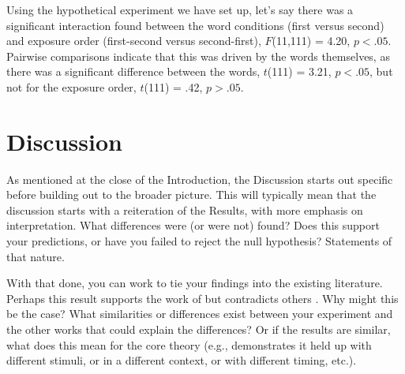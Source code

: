 \documentclass[stu,12pt,floatsintext]{apa7}
\begin{document}
\newcommand{\ttestSig}[2]{\(t\)(#1) = #2, \(p < .05\)}
\newcommand{\ttestInsig}[2]{\(t\)(#1) = #2, \(p > .05\)}
\newcommand{\anovaSig}[3]{\(F\)(#1,#2) = #3, \(p < .05\)}
\newcommand{\anovaInsig}[3]{\(F\)(#1,#2) = #3, \(p > .05\)}

Using the hypothetical experiment we have set up, let's say there was a significant interaction found between the word conditions (first versus second) and exposure order (first-second versus second-first), \anovaSig{11}{111}{4.20}. Pairwise comparisons indicate that this was driven by the words themselves, as there was a significant difference between the words, \ttestSig{111}{3.21}, but not for the exposure order, \ttestInsig{111}{.42}.

\renewcommand{\theenumi}{\arabic{enumi}}
\renewcommand{\labelenumi}{\theenumi.}
\section{Discussion}

As mentioned at the close of the Introduction, the Discussion starts out specific before building out to the broader picture. This will typically mean that the discussion starts with a reiteration of the Results, with more emphasis on interpretation. What differences were (or were not) found? Does this support your predictions, or have you failed to reject the null hypothesis? Statements of that nature.

With that done, you can work to tie your findings into the existing literature. Perhaps this result supports the work of \textcite{Contributor2023} but contradicts others \parencite[e.g.,][]{Sample2024}. %
Why might this be the case? What similarities or differences exist between your experiment and the other works that could explain the differences? Or if the results are similar, what does this mean for the core theory (e.g., demonstrates it held up with different stimuli, or in a different context, or with different timing, etc.).
\end{document}
